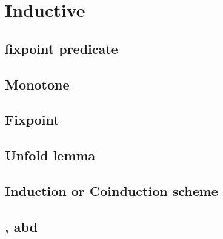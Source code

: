 \documentclass[thesis.tex]{subfiles}
\begin{document}
\chapter{Inductive}

\section{fixpoint predicate}

\section{Monotone}

\section{Fixpoint}

\section{Unfold lemma}

\section{Induction or Coinduction scheme}

\section[iConstructor, iDestruct, iInductive]{,  abd }
\end{document}
